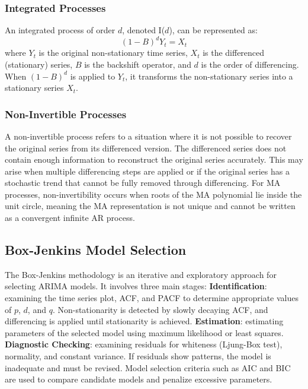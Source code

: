 \documentclass[11pt,a4paper]{article}
\begin{document}
\subsubsection{Integrated Processes}

An integrated process of order $d$, denoted I($d$), can be represented as:
\[
(1 - B)^d Y_t = X_t
\]
where $Y_t$ is the original non-stationary time series, $X_t$ is the differenced (stationary) series, $B$ is the backshift operator, and $d$ is the order of differencing. When $(1-B)^d$ is applied to $Y_t$, it transforms the non-stationary series into a stationary series $X_t$.

\subsubsection{Non-Invertible Processes}

A non-invertible process refers to a situation where it is not possible to recover the original series from its differenced version. The differenced series does not contain enough information to reconstruct the original series accurately. This may arise when multiple differencing steps are applied or if the original series has a stochastic trend that cannot be fully removed through differencing. For MA processes, non-invertibility occurs when roots of the MA polynomial lie inside the unit circle, meaning the MA representation is not unique and cannot be written as a convergent infinite AR process.

\subsection{Box-Jenkins Model Selection}

The Box-Jenkins methodology is an iterative and exploratory approach for selecting ARIMA models. It involves three main stages: \textbf{Identification}: examining the time series plot, ACF, and PACF to determine appropriate values of $p$, $d$, and $q$. Non-stationarity is detected by slowly decaying ACF, and differencing is applied until stationarity is achieved. \textbf{Estimation}: estimating parameters of the selected model using maximum likelihood or least squares. \textbf{Diagnostic Checking}: examining residuals for whiteness (Ljung-Box test), normality, and constant variance. If residuals show patterns, the model is inadequate and must be revised. Model selection criteria such as AIC and BIC are used to compare candidate models and penalize excessive parameters.
\end{document}

